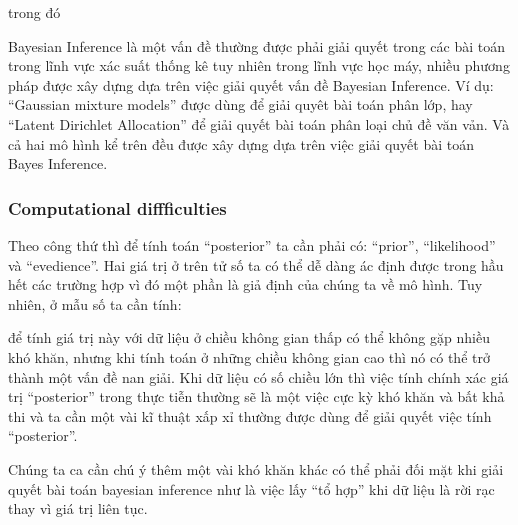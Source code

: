         trong đó 

        
        Bayesian Inference là một vấn đề thường được phải giải quyết trong các bài toán trong lĩnh vực xác suất thống kê tuy nhiên trong lĩnh vực học máy, nhiều phương pháp được xây dựng dựa trên việc giải quyết vấn đề Bayesian Inference. Ví dụ: ``Gaussian mixture models'' được dùng để giải quyêt bài toán phân lớp, hay ``Latent Dirichlet Allocation'' để giải quyết bài toán phân loại chủ đề văn vản. Và cả hai mô hình kể trên đều được xây dựng dựa trên việc giải quyết bài toán Bayes Inference.  

        \subsubsection{Computational diffficulties}
        Theo công thứ thì để tính toán ``posterior'' ta cần phải có: ``prior'', ``likelihood'' và ``evedience''. Hai giá trị ở trên tử số ta có thể dễ dàng ác định được trong hầu hết các trường hợp vì đó một phần là giả định của chúng ta về mô hình. Tuy nhiên, ở mẫu số ta cần tính:

        để tính giá trị này với dữ liệu ở chiều không gian thấp có thể không gặp nhiều khó khăn, nhưng khi tính toán ở những chiều không gian cao thì nó có thể trở thành một vấn đề nan giải. Khi dữ liệu có số chiều lớn thì việc tính chính xác giá trị ``posterior'' trong thực tiễn thường sẽ là một việc cực kỳ khó khăn và bất khả thi và ta cần một vài kĩ thuật xấp xỉ thường được dùng để giải quyết việc tính ``posterior''. 

        Chúng ta ca cần chú ý thêm một vài khó khăn khác có thể phải đối mặt khi giải quyết bài toán bayesian inference  như là việc lấy ``tổ hợp'' khi dữ liệu là rời rạc thay vì giá trị liên tục. 

